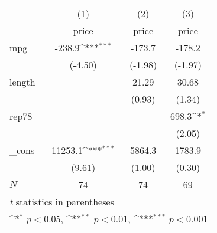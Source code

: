 {
\def\sym#1{\ifmmode^{#1}\else\(^{#1}\)\fi}
\begin{tabular}{l*{3}{c}}
\hline\hline
            &\multicolumn{1}{c}{(1)}&\multicolumn{1}{c}{(2)}&\multicolumn{1}{c}{(3)}\\
            &\multicolumn{1}{c}{price}&\multicolumn{1}{c}{price}&\multicolumn{1}{c}{price}\\
\hline
mpg         &      -238.9\sym{***}&      -173.7         &      -178.2         \\
            &     (-4.50)         &     (-1.98)         &     (-1.97)         \\
[1em]
length      &                     &       21.29         &       30.68         \\
            &                     &      (0.93)         &      (1.34)         \\
[1em]
rep78       &                     &                     &       698.3\sym{*}  \\
            &                     &                     &      (2.05)         \\
[1em]
\_cons      &     11253.1\sym{***}&      5864.3         &      1783.9         \\
            &      (9.61)         &      (1.00)         &      (0.30)         \\
\hline
\(N\)       &          74         &          74         &          69         \\
\hline\hline
\multicolumn{4}{l}{\footnotesize \textit{t} statistics in parentheses}\\
\multicolumn{4}{l}{\footnotesize \sym{*} \(p<0.05\), \sym{**} \(p<0.01\), \sym{***} \(p<0.001\)}\\
\end{tabular}
}
